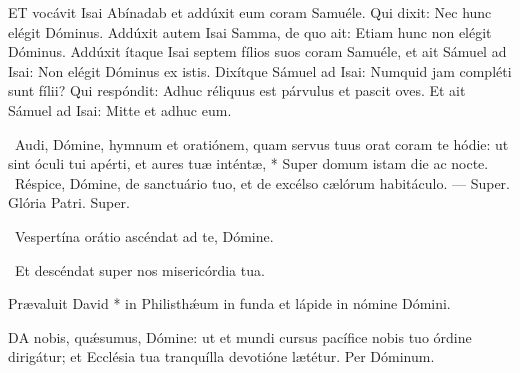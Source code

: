 
\lettrine[lines=2]{E}{T} vocávit Isai Abínadab et addúxit eum coram Samuéle. Qui dixit: Nec hunc elégit Dóminus. Addúxit autem Isai Samma, de quo ait: Etiam hunc non elégit Dóminus. Addúxit ítaque Isai septem fílios suos coram Samuéle, et ait Sámuel ad Isai: Non elégit Dóminus ex istis. Dixítque Sámuel ad Isai: Numquid jam compléti sunt fílii? Qui respóndit: Adhuc réliquus est párvulus et pascit oves. Et ait Sámuel ad Isai: Mitte et adhuc eum.

\R\ Audi, Dómine, hymnum et oratiónem, quam servus tuus orat coram te hódie: ut sint óculi tui apérti, et aures tuæ inténtæ, * Super domum istam die ac nocte. \V\ Réspice, Dómine, de sanctuário tuo, et de excélso cælórum habitáculo. --- Super. Glória Patri. Super.


\V\ Vespertína orátio ascéndat ad te, Dómine.

\R\ Et descéndat super nos misericórdia tua.

 Prævaluit David * in Philisthǽum in funda et lápide in nómine Dómini.


\lettrine[lines=2]{D}{A} nobis, quǽsumus, Dómine: ut et mundi cursus pacífice nobis tuo órdine dirigátur; et Ecclésia tua tranquílla devotióne lætétur. Per Dóminum.


